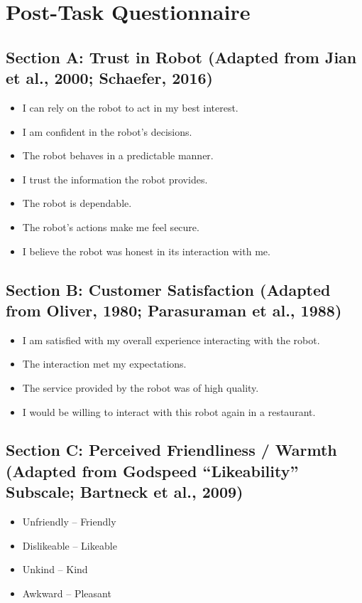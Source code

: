 \documentclass[conference]{IEEEtran}
\begin{document}
\section{Post-Task Questionnaire}


\subsection{Section A: Trust in Robot (Adapted from Jian et al., 2000; Schaefer, 2016)}
\begin{itemize}
\item I can rely on the robot to act in my best interest.
\item I am confident in the robot’s decisions.
\item The robot behaves in a predictable manner.
\item I trust the information the robot provides.
\item The robot is dependable.
\item The robot’s actions make me feel secure.
\item I believe the robot was honest in its interaction with me.
\end{itemize}

\subsection{Section B: Customer Satisfaction (Adapted from Oliver, 1980; Parasuraman et al., 1988)}
\begin{itemize}
\item I am satisfied with my overall experience interacting with the robot.
\item The interaction met my expectations.
\item The service provided by the robot was of high quality.
\item I would be willing to interact with this robot again in a restaurant.
\end{itemize}

\subsection{Section C: Perceived Friendliness / Warmth (Adapted from Godspeed “Likeability” Subscale; Bartneck et al., 2009)}
\begin{itemize}
\item Unfriendly – Friendly
\item Dislikeable – Likeable
\item Unkind – Kind
\item Awkward – Pleasant
\end{itemize}
\end{document}
